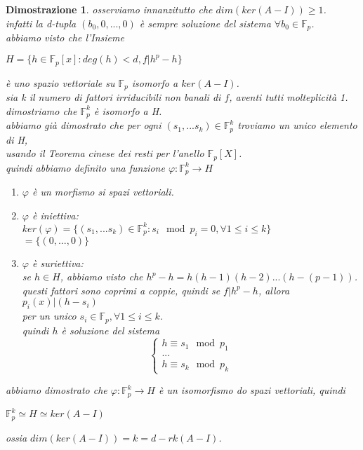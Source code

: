 \documentclass[a4paper,12pt]{article}
\theoremstyle{def}
\theoremstyle{prop}
\theoremstyle{esempio}
\theoremstyle{dimostrazione}
\newtheorem*{dimostrazione}{Dimostrazione}
\theoremstyle{teo}
\theoremstyle{osservazione}
\begin{document}
\begin{dimostrazione}
	osserviamo innanzitutto che \(dim(ker(A - I)) \geq 1\).\\
	infatti la d-tupla \((b_0, 0 , ..., 0)\) è sempre soluzione del sistema \(\forall b_0 \in \mathbb{F}_p\).\\
	abbiamo visto che l'Insieme
	\begin{center}
		\(H = \{ h \in \mathbb{F}_p[x] : deg (h) < d, f | h^p - h\}\)
	\end{center}
	è uno spazio vettoriale su \(\mathbb{F}_p\) isomorfo a \(ker(A - I)\).\\
	sia k il numero di fattori irriducibili non banali di \(f\), aventi tutti molteplicità 1.\\
	dimostriamo che \(\mathbb{F}_p^k\) è isomorfo a H.\\
	abbiamo già dimostrato che per ogni \((s_1, ... s_k) \in \mathbb{F}_p^k\) troviamo un unico elemento di H,\\
	usando il Teorema cinese dei resti per l'anello \(\mathbb{F}_p[X]\).\\
	quindi abbiamo definito una funzione \(\varphi : \mathbb{F}_p^k \rightarrow H\)
	\begin{enumerate}
		\item \(\varphi\) è un morfismo si spazi vettoriali.
		\item \(\varphi\) è iniettiva:\\
		      \(ker(\varphi) = \{(s_1, ... s_k) \in \mathbb{F}_p^k : s_i \mod p_i = 0, \forall 1 \leq i \leq k\}\)\\
		      \(=\{(0, ... , 0)\}\)
		\item \(\varphi\) è suriettiva:\\
		      se \(h \in H\), abbiamo visto che \(h^p - h = h (h - 1)(h - 2)...(h - (p - 1))\).\\
		      questi fattori sono coprimi a coppie, quindi se \(f | h^p - h\), allora \(p_i(x) | (h - s_i)\)\\
		      per un unico \(s_i \in \mathbb{F}_p, \forall 1 \leq i \leq k\).\\
		      quindi \(h\) è soluzione del sistema
		      \[
			      \begin{cases}
				      h \equiv s_1 \mod p_1 \\
				      ...                   \\
				      h \equiv s_k \mod p_k
			      \end{cases}
		      \]
	\end{enumerate}
	abbiamo dimostrato che \(\varphi : \mathbb{F}_p^k \rightarrow H \) è un isomorfismo do spazi vettoriali, quindi
	\begin{center}
		\(\mathbb{F}_p^k \simeq H \simeq ker(A - I)\)
	\end{center}
	ossia \(dim(ker(A - I)) = k = d - rk(A - I)\).
\end{dimostrazione}
\end{document}
